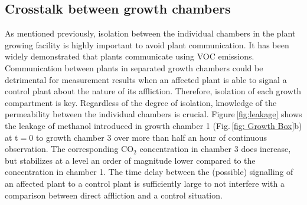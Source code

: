 \documentclass[reprint,superscriptaddress,aps,amsmath,amssymb]{revtex4-1}
\begin{document}
\subsection{Crosstalk between growth chambers}
As mentioned previously, isolation between the individual chambers in the plant growing facility is highly important to avoid plant communication. It has been widely demonstrated that plants communicate using VOC emissions. Communication between plants in separated growth chambers could be detrimental for measurement results when an affected plant is able to signal a control plant about the nature of its affliction. Therefore, isolation of each growth compartment is key. Regardless of the degree of isolation, knowledge of the permeability between the individual chambers is crucial. Figure\,\ref{fig:leakage} shows the leakage of methanol introduced in growth chamber 1 (Fig.\,\ref{fig: Growth Box}b) at t$=0$ to growth chamber 3 over more than half an hour of continuous observation. The corresponding CO$_2$ concentration in chamber 3 does increase, but stabilizes at a level an order of magnitude lower compared to the concentration in chamber 1. The time delay between the (possible) signalling of an affected plant to a control plant is sufficiently large to not interfere with a comparison between direct affliction and a control situation.
\end{document}
